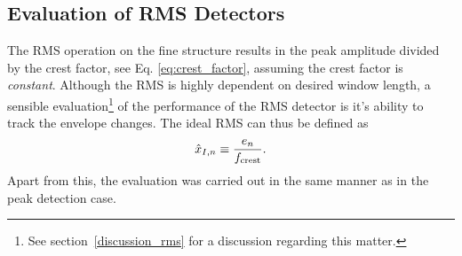 \documentclass[../main2.tex]{subfiles}
\begin{document}
\subsection{Evaluation of RMS Detectors}\label{method_rms_detectors}
The RMS operation on the fine structure results in the peak amplitude divided by the crest factor, see Eq. \eqref{eq:crest_factor}, assuming the crest factor is \emph{constant}. Although the RMS is highly dependent on desired window length, a sensible evaluation\footnote{See section~\ref{discussion_rms} for a discussion regarding this matter.} of the performance of the RMS detector is it's ability to track the envelope changes. The ideal RMS can thus be defined as
\begin{align}
\hat{x}_{I,n} \equiv \frac{e_n}{f_\text{crest}} \label{eq:ideal_rms}.
\end{align}
Apart from this, the evaluation was carried out in the same manner as in the peak detection case.
\end{document}
